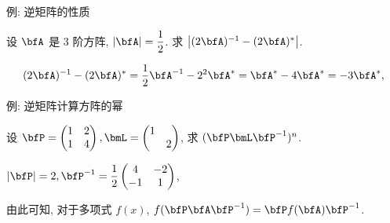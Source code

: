 \begin{frame}{例: 逆矩阵的性质}
	\onslide<+->
	\begin{example}
		设 $\bfA$ 是 $3$ 阶方阵, $|\bfA|=\dfrac12$.
		求 $\bigl|(2\bfA)^{-1}-(2\bfA)^*\bigr|$.
	\end{example}
	\onslide<+->
	\begin{solution}
		\[(2\bfA)^{-1}-(2\bfA)^*
		=\frac12\bfA^{-1}-2^2\bfA^*=\bfA^*-4\bfA^*=-3\bfA^*,\]
		\onslide<+->{因此
		\[\bigl|(2\bfA)^{-1}-(2\bfA)^*\bigr|=-27|\bfA^*|=-27|\bfA|^2=-\frac{27}4.\]
		}
		\vspace{-\baselineskip}
	\end{solution}
\end{frame}


\begin{frame}{例: 逆矩阵计算方阵的幂}
	\onslide<+->
	\begin{example}
		设 $\bfP=\begin{pmatrix}
			1&2\\1&4
		\end{pmatrix},\bmL=\begin{pmatrix}
			1&\\&2
		\end{pmatrix}$, 求 $(\bfP\bmL\bfP^{-1})^n$.
	\end{example}
	\onslide<+->
	\begin{solution}
		$|\bfP|=2,\bfP^{-1}=\dfrac12\begin{pmatrix}
			4&-2\\-1&1
		\end{pmatrix}$,
	\vspace{-\baselineskip}
	\end{solution}
	\onslide<+->
	由此可知, 对于多项式 $f(x)$, $f(\bfP\bfA\bfP^{-1})=\bfP f(\bfA)\bfP^{-1}$.
\end{frame}


